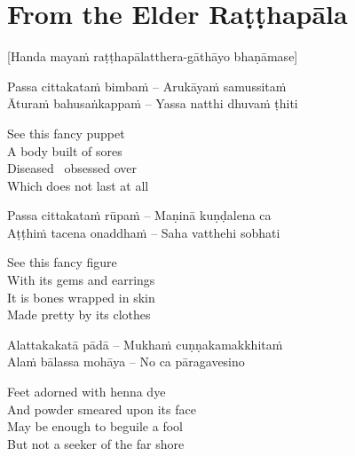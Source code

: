 \section{From the Elder Raṭṭhapāla}
\label{ratthapala}

\begin{center}
  [Handa mayaṁ raṭṭhapālatthera-gāthāyo bhaṇāmase]
\end{center}

\begin{twochants}
  Passa cittakataṁ bimbaṁ – Arukāyaṁ samussitaṁ\\
  Āturaṁ bahusaṅkappaṁ – Yassa natthi dhuvaṁ ṭhiti\\
\end{twochants}

\begin{english}
  See this fancy puppet\\
  A body built of sores\\
  Diseased \breathmark\ obsessed over\\
  Which does not last at all
\end{english}

\begin{twochants}
  Passa cittakataṁ rūpaṁ – Maṇinā kuṇḍalena ca\\
  Aṭṭhiṁ tacena onaddhaṁ – Saha vatthehi sobhati\\
\end{twochants}

\begin{english}
  See this fancy figure\\
  With its gems and earrings\\
  It is bones wrapped in skin\\
  Made pretty by its clothes
\end{english}

\begin{twochants}
  Alattakakatā pādā – Mukhaṁ cuṇṇakamakkhitaṁ\\
  Alaṁ bālassa mohāya – No ca pāragavesino\\
\end{twochants}

\begin{english}
  Feet adorned with henna dye\\
  And powder smeared upon its face\\
  May be enough to beguile a fool\\
  But not a seeker of the far shore
\end{english}

